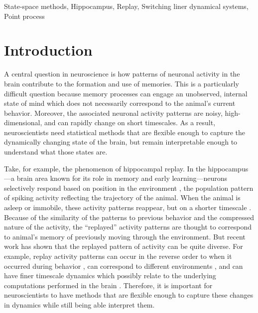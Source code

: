 \documentclass[conference]{IEEEtran}
\begin{document}
\begin{IEEEkeywords}
State-space methods, Hippocampus, Replay, Switching liner dynamical systems, Point process
\end{IEEEkeywords}

\section{Introduction}
A central question in neuroscience is how patterns of neuronal activity in the brain contribute to the formation and use of memories. This is a particularly difficult question because memory processes can engage an unobserved, internal state of mind which does not necessarily correspond to the animal's current behavior. Moreover, the associated neuronal activity patterns are noisy, high-dimensional, and can rapidly change on short timescales. As a result, neuroscientists need statistical methods that are flexible enough to capture the dynamically changing state of the brain, but remain interpretable enough to understand what those states are.

Take, for example, the phenomenon of hippocampal replay. In the hippocampus---a brain area known for its role in memory and early learning---neurons selectively respond based on position in the environment \cite{OKeefehippocampusspatialmap1971}, the population pattern of spiking activity reflecting the trajectory of the animal. When the animal is asleep or immobile, these activity patterns reappear, but on a shorter timescale \cite{WilsonReactivationhippocampalensemble1994, NadasdyReplayTimeCompression1999}. Because of the similarity of the patterns to previous behavior and the compressed nature of the activity, the “replayed” activity patterns are thought to correspond to animal's memory of previously moving through the environment. But recent work has shown that the replayed pattern of activity can be quite diverse. For example, replay activity patterns can occur in the reverse order to when it occurred during behavior \cite{FosterReversereplaybehavioural2006, DibaForwardreversehippocampal2007}, can correspond to different environments \cite{KarlssonAwakereplayremote2009}, and can have finer timescale dynamics which possibly relate to the underlying computations performed in the brain \cite{PfeifferAutoassociativedynamicsgeneration2015}. Therefore, it is important for neuroscientists to have methods that are flexible enough to capture these changes in dynamics while still being able interpret them.
\end{document}
